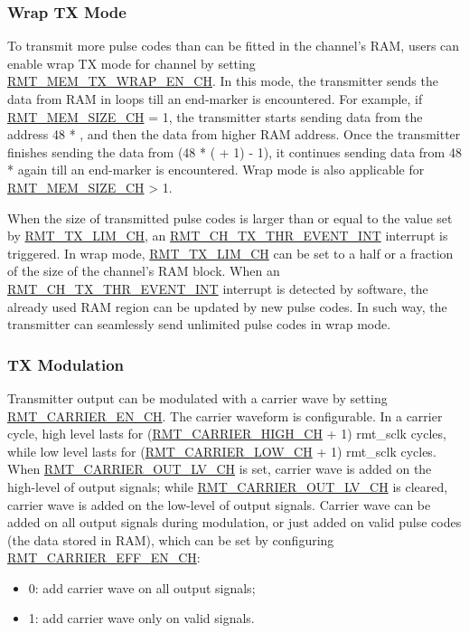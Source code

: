 \documentclass[main\_\_EN.tex]{subfiles}
\begin{document}
\subsubsection{Wrap TX Mode}\label{sec:wrap-tx-mode}

To transmit more pulse codes than can be fitted in the channel’s RAM, users can enable wrap TX mode for channel  by setting \hyperref[fielddesc:RMTMEMTXWRAPENCHN]{RMT\_MEM\_TX\_WRAP\_EN\_CH}. In this mode, the transmitter sends the data from RAM in loops till an end-marker is encountered.
For example, if \hyperref[fielddesc:RMTMEMSIZECHN]{RMT\_MEM\_SIZE\_CH} = 1, the transmitter starts sending data from the address 48 * , and then the data from higher RAM address. Once the transmitter finishes sending the data from (48 * ( + 1) - 1), it continues sending data from 48 *  again till an end-marker is encountered. Wrap mode is also applicable for \hyperref[fielddesc:RMTMEMSIZECHN]{RMT\_MEM\_SIZE\_CH} > 1.

When the size of transmitted pulse codes is larger than or equal to the value set by  \hyperref[fielddesc:RMTTXLIMCHN]{RMT\_TX\_LIM\_CH}, an \hyperref[int:RMTCHnTXTHREVENTINT]{RMT\_CH\_TX\_THR\_EVENT\_INT} interrupt is triggered. In wrap mode,  \hyperref[fielddesc:RMTTXLIMCHN]{RMT\_TX\_LIM\_CH} can be set to a half or a fraction of the size of the channel’s RAM block. When an  \hyperref[int:RMTCHnTXTHREVENTINT]{RMT\_CH\_TX\_THR\_EVENT\_INT} interrupt is detected by software, the already used RAM region can be updated by new pulse codes. In such way, the transmitter can seamlessly send unlimited pulse codes in wrap mode.


\subsubsection{TX Modulation}

Transmitter output can be modulated with a carrier wave by setting  \hyperref[fielddesc:RMTCARRIERENCHN]{RMT\_CARRIER\_EN\_CH}. The carrier waveform is configurable. 
In a carrier cycle, high level lasts for (\hyperref[fielddesc:RMTCARRIERHIGHCHN]{RMT\_CARRIER\_HIGH\_CH} + 1) rmt\_sclk cycles, while low level lasts for (\hyperref[fielddesc:RMTCARRIERLOWCHN]{RMT\_CARRIER\_LOW\_CH} + 1) rmt\_sclk cycles. When  \hyperref[fielddesc:RMTCARRIEROUTLVCHN]{RMT\_CARRIER\_OUT\_LV\_CH} is set, carrier wave is added on the high-level of output signals; while  \hyperref[fielddesc:RMTCARRIEROUTLVCHN]{RMT\_CARRIER\_OUT\_LV\_CH} is cleared, carrier wave is added on the low-level of output signals. 
Carrier wave can be added on all output signals during modulation, or just added on valid pulse codes (the data stored in RAM), which can be set by configuring \hyperref[fielddesc:RMTCARRIEREFFENCHN]{RMT\_CARRIER\_EFF\_EN\_CH}: 
\begin{itemize}
    \item 0: add carrier wave on all output signals;
    \item 1: add carrier wave only on valid signals.
\end{itemize}
\end{document}
